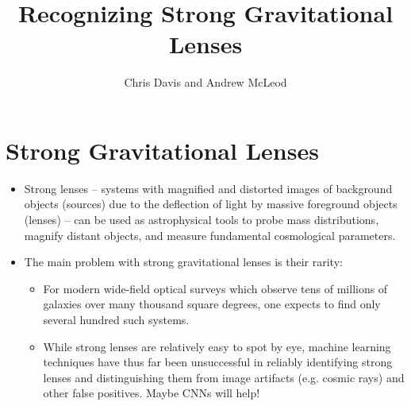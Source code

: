\documentclass{ucbposter}
\begin{document}
\title{Recognizing Strong Gravitational Lenses}
\author{Chris Davis and Andrew McLeod}
\makeposter

\section{Strong Gravitational Lenses}
\begin{itemize}
\item{Strong lenses -- systems with magnified and
distorted images of background objects (sources) due to the deflection of light
by massive foreground objects (lenses) -- can be used as astrophysical tools to
probe mass distributions, magnify distant objects, and measure fundamental
cosmological parameters.}
\item{The main problem with strong gravitational lenses is their rarity:}
  \begin{itemize}
    \item{For
modern wide-field optical surveys which observe tens of millions of galaxies
over many thousand square degrees, one expects to find only several hundred
such systems.} 
\item{While strong lenses
are relatively easy to spot by eye, machine learning techniques have thus far
been unsuccessful in reliably identifying strong lenses and distinguishing them from
image artifacts (e.g. cosmic rays) and other false positives. Maybe CNNs will help!}
\end{itemize}
\end{itemize}





\end{document}
